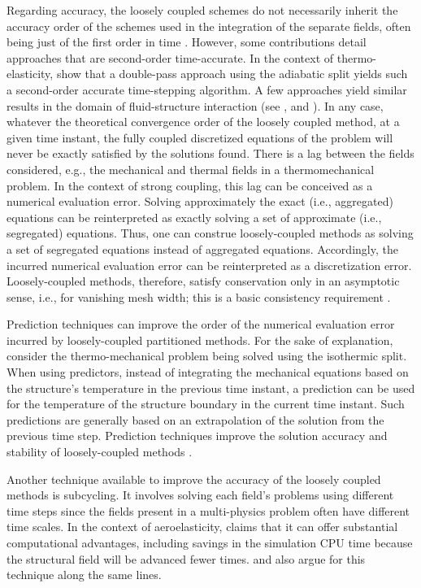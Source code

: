 Regarding accuracy, the loosely coupled schemes do not necessarily inherit the accuracy order of the schemes used in the integration of the separate fields, often being just of the first order in time \citep{farhat_provably_2006}.
However, some contributions detail approaches that are second-order time-accurate.
In the context of thermo-elasticity, \cite{armero_new_1992} show that a double-pass approach using the adiabatic split yields such a second-order accurate time-stepping algorithm.
A few approaches yield similar results in the domain of fluid-structure interaction (see \cite{piperno_explicitimplicit_1997}, \cite{farhat_provably_2006} and \cite{farhat_robust_2010}).
In any case, whatever the theoretical convergence order of the loosely coupled method, at a given time instant, the fully coupled discretized equations of the problem will never be exactly satisfied by the solutions found.
There is a lag between the fields considered, e.g., the mechanical and thermal fields in a thermomechanical problem.
In the context of strong coupling, this lag can be conceived as a numerical evaluation error.
Solving approximately the exact (i.e., aggregated) equations can be reinterpreted as exactly solving a set of approximate (i.e., segregated) equations.
Thus, one can construe loosely-coupled methods as solving a set of segregated equations instead of aggregated equations.
Accordingly, the incurred numerical evaluation error can be reinterpreted as a discretization error.
Loosely-coupled methods, therefore, satisfy conservation only in an asymptotic sense, i.e., for vanishing mesh width; this is a basic consistency requirement \cite{michler_efficient_2005}.

Prediction techniques can improve the order of the numerical evaluation error incurred by loosely-coupled partitioned methods.
For the sake of explanation, consider the thermo-mechanical problem being solved using the isothermic split.
When using predictors, instead of integrating the mechanical equations based on the structure's temperature in the previous time instant, a prediction can be used for the temperature of the structure boundary in the current time instant.
Such predictions are generally based on an extrapolation of the solution from the previous time step.
Prediction techniques improve the solution accuracy and stability of loosely-coupled methods \citep{piperno_explicitimplicit_1997, piperno_partitioned_2001, michler_efficient_2005, farhat_provably_2006}.

Another technique available to improve the accuracy of the loosely coupled methods is subcycling.
It involves solving each field's problems using different time steps since the fields present in a multi-physics problem often have different time scales.
In the context of aeroelasticity, \cite{piperno_partitioned_1995} claims that it can offer substantial computational advantages, including savings in the simulation CPU time because the structural field will be advanced fewer times.
\cite{farhat_high_1997} and \cite{piperno_explicitimplicit_1997} also argue for this technique along the same lines.

